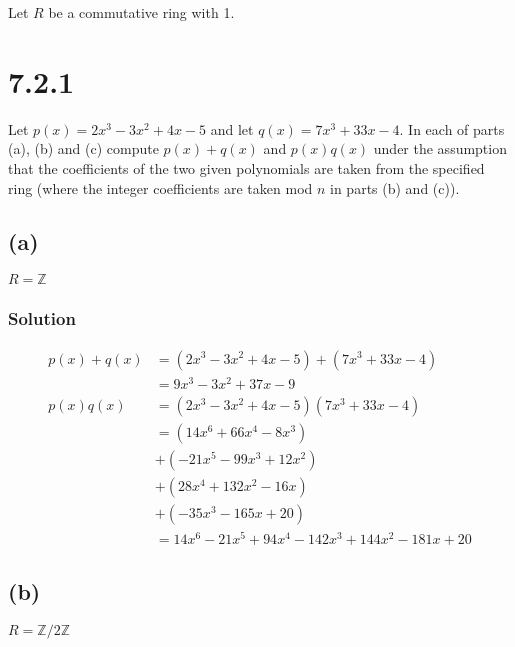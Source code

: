 \documentclass[fleqn]{article}
\begin{document}
    \break
    
    Let $R$ be a commutative ring with 1.
    
    \section{7.2.1}
    Let $p(x) = 2x^3 - 3x^2 + 4x - 5$ and let $q(x) = 7x^3 + 33x - 4$.  In each of parts (a), (b) and (c) compute $p(x) + q(x)$ and $p(x)q(x)$ under the assumption that the coefficients of the two given polynomials are taken from the specified ring (where the integer coefficients are taken mod $n$ in parts (b) and (c)).
        
        \subsection{(a)}
        $R = \mathbb{Z}$
            
            \subsubsection{Solution}
            \begin{align}
                p(x) + q(x) &= (2x^3 - 3x^2 + 4x - 5) + (7x^3 + 33x - 4) \\
                    &= 9x^3 - 3x^2 + 37x - 9 \\
                p(x)q(x) &= (2x^3 - 3x^2 + 4x - 5)(7x^3 + 33x - 4) \\
                    &= (14x^6 + 66x^4 - 8x^3) \\
                        &+ (-21x^5 - 99x^3 + 12x^2) \\
                        &+ (28x^4 + 132x^2 - 16x) \\
                        &+ (-35x^3 - 165x + 20) \\
                    &= 14x^6 - 21x^5 + 94x^4 - 142x^3 + 144x^2 - 181x + 20
            \end{align}
        
        \subsection{(b)}
        $R = \mathbb{Z}/2\mathbb{Z}$
            
\end{document}
